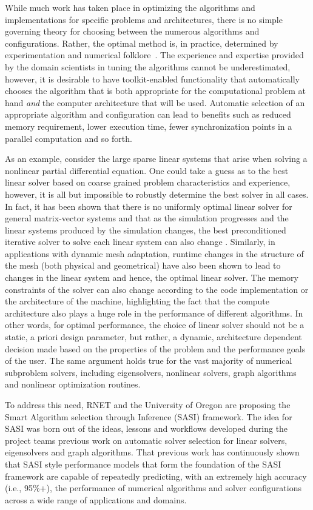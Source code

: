 While much work has taken place in optimizing the algorithms and implementations for specific problems and architectures, there is no simple governing theory for choosing between the numerous algorithms and configurations. Rather, the optimal method is, in practice, determined by experimentation and numerical folklore~\cite{EijkFuen2010:multistage}. The experience and expertise provided by the domain scientists in tuning the algorithms cannot be underestimated, however, it is desirable to have toolkit-enabled functionality that automatically chooses the algorithm that is both appropriate for the computational problem at hand \emph{and} the computer architecture that will be used. Automatic selection of an appropriate algorithm and configuration can lead to benefits such as reduced memory requirement, lower execution time, fewer synchronization points in a parallel computation and so forth. 

As an example, consider the large sparse linear systems that arise when solving a nonlinear partial differential equation. One could take a guess as to the best linear solver based on coarse grained problem characteristics and experience, however, it is all but impossible to robustly determine the best solver in all cases. In fact, it has been shown that there is no uniformly optimal linear solver for general matrix-vector systems and that as the simulation progresses and the linear systems produced by the simulation changes, the best preconditioned iterative solver to solve each linear system can also change \cite{Eller2012}. Similarly, in applications with dynamic mesh adaptation, runtime changes in the structure of the mesh (both physical and geometrical) have also been shown to lead to changes in the linear system and hence, the optimal linear solver. The memory constraints of the solver can also change according to the code implementation or the architecture of the machine, highlighting the fact that the compute architecture also plays a huge role in the performance of different algorithms. In other words, for optimal performance, the choice of linear solver should not be a static, a priori design parameter, but rather, a dynamic, architecture dependent decision made based on the properties of the problem and the performance goals of the user. The same argument holds true for the vast majority of numerical subproblem solvers, including eigensolvers, nonlinear solvers, graph algorithms and nonlinear optimization routines. 

To address this need, RNET and the University of Oregon are proposing the Smart Algorithm selection through Inference (SASI) framework. The idea for SASI was born out of the ideas, lessons and workflows developed during the project teams previous work on automatic solver selection for linear solvers, eigensolvers and graph algorithms. That previous work has continuously shown that SASI style performance models that form the foundation of the SASI framework are capable of repeatedly predicting, with an extremely high accuracy (i.e., 95\%+), the performance of numerical algorithms and solver configurations across a wide range of applications and domains.

